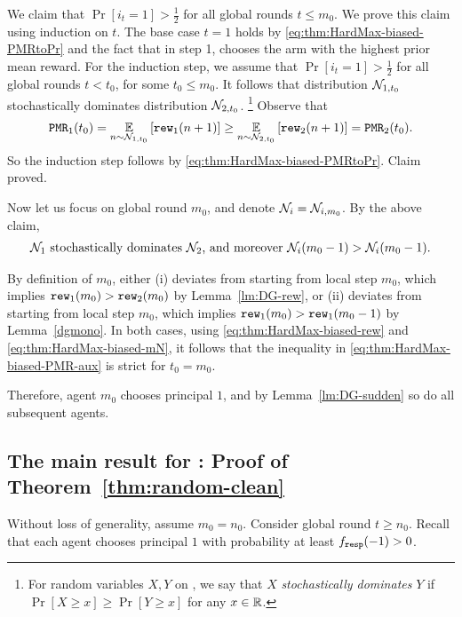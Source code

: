 We claim that $\Pr[i_t=1]>\tfrac12$ for all global rounds $t\leq m_0$. We prove this claim using induction on $t$. The base case $t=1$ holds by \eqref{eq:thm:HardMax-biased-PMRtoPr} and the fact that in step 1, \DynGreedy chooses the arm with the highest prior mean reward. For the induction step, we assume that $\Pr[i_t=1]>\tfrac12$ for all global rounds $t<t_0$, for some $t_0\leq  m_0$. It follows that distribution $\mathcal{N}_{1,t_0}$ stochastically dominates distribution $\mathcal{N}_{2,t_0}$.%
\footnote{For random variables $X,Y$ on \R, we say that $X$ \emph{stochastically dominates} $Y$ if $\Pr[X\geq x] \geq \Pr[Y\geq x]$ for any $x\in \mathbb{R}$.}
Observe that
\begin{align}\label{eq:thm:HardMax-biased-PMR-aux}
\mathtt{PMR}_1(t_0)
  = \operatorname*{\mathbb{E}}_{n\sim \mathcal{N}_{1,t_0}}\left[\mathtt{rew}_1(n+1)\right]
  \geq \operatorname*{\mathbb{E}}_{n\sim \mathcal{N}_{2,t_0}}\left[\mathtt{rew}_2(n+1)\right]
  = \mathtt{PMR}_2(t_0).
\end{align}
So the induction step follows by \eqref{eq:thm:HardMax-biased-PMRtoPr}. Claim proved.

Now let us focus on global round $m_0$, and denote $\mathcal{N}_i = \mathcal{N}_{i,m_0}$.  By the above claim,
\begin{align}\label{eq:thm:HardMax-biased-mN}
\text{$\mathcal{N}_1$ stochastically dominates $\mathcal{N}_2$, and moreover
    $\mathcal{N}_i(m_0-1)>\mathcal{N}_i(m_0-1)$.}
\end{align}

By definition of $m_0$, either (i) \alg[2] deviates from \DynGreedy starting from local step $m_0$, which implies $\mathtt{rew}_1(m_0)> \mathtt{rew}_2(m_0)$ by Lemma~\ref{lm:DG-rew}, or (ii) \DynGreedy deviates from \StaticGreedy starting from local step $m_0$, which implies $\mathtt{rew}_1(m_0)>\mathtt{rew}_1(m_0-1)$ by Lemma~\ref{dgmono}. In both cases, using \eqref{eq:thm:HardMax-biased-rew} and \eqref{eq:thm:HardMax-biased-mN}, it follows that the inequality in \eqref{eq:thm:HardMax-biased-PMR-aux} is strict for $t_0=m_0$.

Therefore, agent $m_0$ chooses principal $1$, and by Lemma~\ref{lm:DG-sudden} so do all subsequent agents.



\subsection{The main result for \HardMaxRandom:
Proof of Theorem~\ref{thm:random-clean}}
\label{sec:proofs-HMR-main}

Without loss of generality, assume $m_0 = n_0$.
Consider global round $t\geq n_0$. Recall that each agent chooses principal $1$ with probability at least
    $f_{\mathtt{resp}}(-1)>0$.

